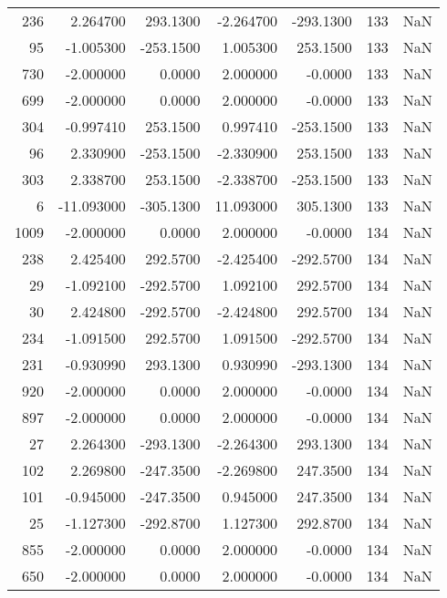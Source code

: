 \begin{tabular}{rrrrrrr}
 236 &    2.264700 &  293.1300 &   -2.264700 &   -293.1300 &         133 & NaN \\
  95 &   -1.005300 & -253.1500 &    1.005300 &    253.1500 &         133 & NaN \\
 730 &   -2.000000 &    0.0000 &    2.000000 &     -0.0000 &         133 & NaN \\
 699 &   -2.000000 &    0.0000 &    2.000000 &     -0.0000 &         133 & NaN \\
 304 &   -0.997410 &  253.1500 &    0.997410 &   -253.1500 &         133 & NaN \\
  96 &    2.330900 & -253.1500 &   -2.330900 &    253.1500 &         133 & NaN \\
 303 &    2.338700 &  253.1500 &   -2.338700 &   -253.1500 &         133 & NaN \\
   6 &  -11.093000 & -305.1300 &   11.093000 &    305.1300 &         133 & NaN \\
1009 &   -2.000000 &    0.0000 &    2.000000 &     -0.0000 &         134 & NaN \\
 238 &    2.425400 &  292.5700 &   -2.425400 &   -292.5700 &         134 & NaN \\
  29 &   -1.092100 & -292.5700 &    1.092100 &    292.5700 &         134 & NaN \\
  30 &    2.424800 & -292.5700 &   -2.424800 &    292.5700 &         134 & NaN \\
 234 &   -1.091500 &  292.5700 &    1.091500 &   -292.5700 &         134 & NaN \\
 231 &   -0.930990 &  293.1300 &    0.930990 &   -293.1300 &         134 & NaN \\
 920 &   -2.000000 &    0.0000 &    2.000000 &     -0.0000 &         134 & NaN \\
 897 &   -2.000000 &    0.0000 &    2.000000 &     -0.0000 &         134 & NaN \\
  27 &    2.264300 & -293.1300 &   -2.264300 &    293.1300 &         134 & NaN \\
 102 &    2.269800 & -247.3500 &   -2.269800 &    247.3500 &         134 & NaN \\
 101 &   -0.945000 & -247.3500 &    0.945000 &    247.3500 &         134 & NaN \\
  25 &   -1.127300 & -292.8700 &    1.127300 &    292.8700 &         134 & NaN \\
 855 &   -2.000000 &    0.0000 &    2.000000 &     -0.0000 &         134 & NaN \\
 650 &   -2.000000 &    0.0000 &    2.000000 &     -0.0000 &         134 & NaN \\

\end{tabular}
